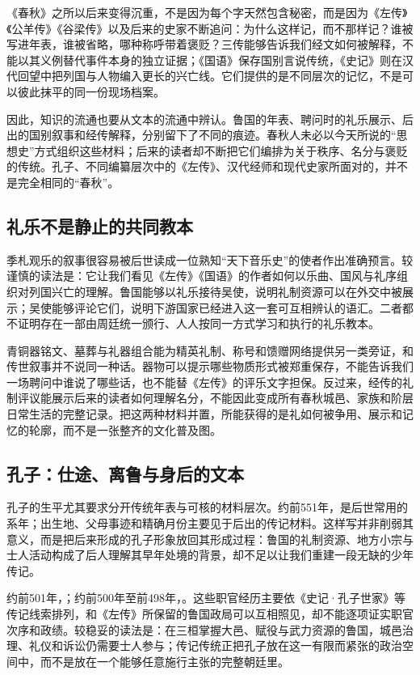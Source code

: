 《春秋》之所以后来变得沉重，不是因为每个字天然包含秘密，而是因为《左传》《公羊传》《谷梁传》以及后来的史家不断追问：为什么这样记，而不那样记？谁被写进年表，谁被省略，哪种称呼带着褒贬？三传能够告诉我们经文如何被解释，不能以其义例替代事件本身的独立证据；《国语》保存国别言说传统，《史记》则在汉代回望中把列国与人物编入更长的兴亡线。它们提供的是不同层次的记忆，不是可以彼此抹平的同一份现场档案。

因此，知识的流通也要从文本的流通中辨认。鲁国的年表、聘问时的礼乐展示、后出的国别叙事和经传解释，分别留下了不同的痕迹。春秋人未必以今天所说的“思想史”方式组织这些材料；后来的读者却不断把它们编排为关于秩序、名分与褒贬的传统。孔子、不同编纂层次中的《左传》、汉代经师和现代史家所面对的，并不是完全相同的“春秋”。

\subsection{礼乐不是静止的共同教本}

季札观乐的叙事很容易被后世读成一位熟知“天下音乐史”的使者作出准确预言。较谨慎的读法是：它让我们看见《左传》《国语》的作者如何以乐曲、国风与礼序组织对列国兴亡的理解。鲁国能够以礼乐接待吴使，说明礼制资源可以在外交中被展示；吴使能够评论它们，说明下游国家已经进入这一套可互相辨认的语汇。二者都不证明存在一部由周廷统一颁行、人人按同一方式学习和执行的礼乐教本。

青铜器铭文、墓葬与礼器组合能为精英礼制、称号和馈赠网络提供另一类旁证，和传世叙事并不说同一种话。器物可以提示哪些物质形式被郑重保存，不能告诉我们一场聘问中谁说了哪些话，也不能替《左传》的评乐文字担保。反过来，经传的礼制评议能展示后来的读者如何理解名分，不能因此变成所有春秋城邑、家族和阶层日常生活的完整记录。把这两种材料并置，所能获得的是礼如何被争用、展示和记忆的轮廓，而不是一张整齐的文化普及图。

\subsection{孔子：仕途、离鲁与身后的文本}

孔子的生平尤其要求分开传统年表与可核的材料层次。约前551年，是后世常用的系年；出生地、父母事迹和精确月份主要见于后出的传记材料。这样写并非削弱其意义，而是把后来形成的孔子形象放回其形成过程：鲁国的礼制资源、地方小宗与士人活动构成了后人理解其早年处境的背景，却不足以让我们重建一段无缺的少年传记。

约前501年，；约前500年至前498年，。这些职官经历主要依《史记·孔子世家》等传记线索排列，和《左传》所保留的鲁国政局可以互相照见，却不能逐项证实职官次序和政绩。较稳妥的读法是：在三桓掌握大邑、赋役与武力资源的鲁国，城邑治理、礼仪和诉讼仍需要士人参与；传记传统正把孔子放在这一有限而紧张的政治空间中，而不是放在一个能够任意施行主张的完整朝廷里。

